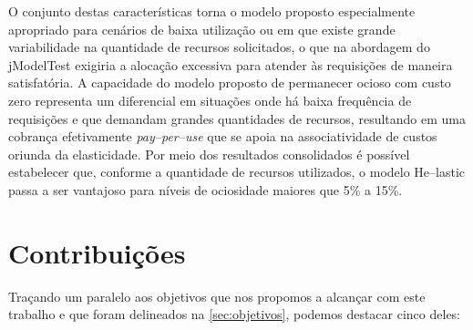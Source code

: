 \documentclass[english,brazilian]{UNISINOSmonografia} %
\begin{document}
O conjunto destas características torna o modelo proposto especialmente apropriado para cenários de baixa utilização ou em que existe grande variabilidade na quantidade de recursos solicitados, o que na abordagem do jModelTest exigiria a alocação excessiva para atender às requisições de maneira satisfatória.
%
A capacidade do modelo proposto de permanecer ocioso com custo zero representa um diferencial em situações onde há baixa frequência de requisições e que demandam grandes quantidades de recursos, resultando em uma cobrança efetivamente \textit{pay--per--use} que se apoia na associatividade de custos oriunda da elasticidade.
%
Por meio dos resultados consolidados é possível estabelecer que, conforme a quantidade de recursos utilizados, o modelo \textsf{He}--lastic passa a ser vantajoso para níveis de ociosidade maiores que 5\% a 15\%.




\section{Contribuições}



Traçando um paralelo aos objetivos que nos propomos a alcançar com este trabalho e que foram delineados na \autoref{sec:objetivos}, podemos destacar cinco deles:
\end{document}
